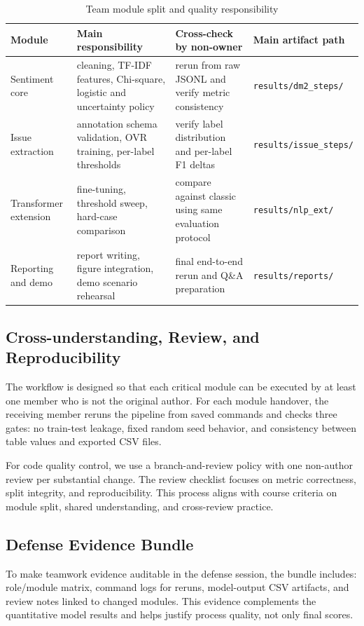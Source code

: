 \documentclass[12pt,a4paper]{article}
\begin{document}
\begin{table}[H]
\centering
\caption{Team module split and quality responsibility}
\label{tab:nlp_team_modules}
\begin{tabular}{>{\raggedright\arraybackslash}p{3.2cm} >{\raggedright\arraybackslash}p{4.8cm} >{\raggedright\arraybackslash}p{3.8cm} >{\raggedright\arraybackslash}p{2.6cm}}
\toprule
Module & Main responsibility & Cross-check by non-owner & Main artifact path \\
\midrule
Sentiment core & cleaning, TF-IDF features, Chi-square, logistic and uncertainty policy & rerun from raw JSONL and verify metric consistency & \texttt{results/dm2\_steps/} \\
Issue extraction & annotation schema validation, OVR training, per-label thresholds & verify label distribution and per-label F1 deltas & \texttt{results/issue\_steps/} \\
Transformer extension & fine-tuning, threshold sweep, hard-case comparison & compare against classic using same evaluation protocol & \texttt{results/nlp\_ext/} \\
Reporting and demo & report writing, figure integration, demo scenario rehearsal & final end-to-end rerun and Q\&A preparation & \texttt{results/reports/} \\
\bottomrule
\end{tabular}
\end{table}

\subsection{Cross-understanding, Review, and Reproducibility}
The workflow is designed so that each critical module can be executed by at least one member who is not the original author. For each module handover, the receiving member reruns the pipeline from saved commands and checks three gates: no train-test leakage, fixed random seed behavior, and consistency between table values and exported CSV files.

For code quality control, we use a branch-and-review policy with one non-author review per substantial change. The review checklist focuses on metric correctness, split integrity, and reproducibility. This process aligns with course criteria on module split, shared understanding, and cross-review practice.

\subsection{Defense Evidence Bundle}
To make teamwork evidence auditable in the defense session, the bundle includes: role/module matrix, command logs for reruns, model-output CSV artifacts, and review notes linked to changed modules. This evidence complements the quantitative model results and helps justify process quality, not only final scores.
\end{document}
